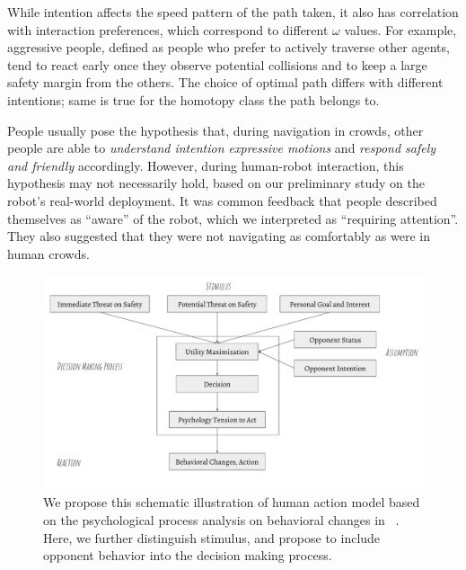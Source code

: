 \documentclass[conference]{IEEEtran}
\begin{document}
While intention affects the speed pattern of the path taken, it also has 
correlation with interaction preferences, which correspond to different $\omega$ 
values. For example, aggressive people, defined as people who prefer to actively traverse 
other agents, tend to react early once they observe potential collisions and 
to keep a large safety margin from the others. The choice of optimal path 
differs with different intentions; same is true for the homotopy class the 
path belongs to.

People usually pose the hypothesis that, during navigation in crowds, other 
people are able to \textit{understand intention expressive motions} and \textit{respond safely 
and friendly} 
accordingly. However, during human-robot interaction, this hypothesis may not 
necessarily hold, based on our preliminary study on the robot's real-world 
deployment. It was common feedback that people described themselves as 
``aware'' of the robot, which we interpreted as ``requiring attention''. They 
also suggested that they were not navigating as 
comfortably as were in human crowds.
\begin{figure}[tb]
  \begin{center}
  \hspace*{-2em}
    \includegraphics[width=1.05\columnwidth]{images/behavior_change.pdf}
  \hspace*{-2em}
  \vspace*{-1.5em}
  \end{center}
  \vspace{-0.05in}
  \caption{We propose this schematic illustration of human action model based 
    on the psychological process analysis on behavioral changes in ~\cite{helbing1995social}.
    Here, we further distinguish stimulus, and propose to include opponent 
    behavior into the decision making process.}
\vspace{-0.05in}
\label{fig:behavior}
\end{figure}
\vspace{-.3em}
\end{document}
